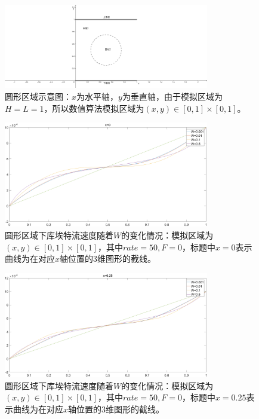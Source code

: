 \documentclass[11pt,UTF8]{ctexart}
\begin{document}
    \begin{figure}[h]
        \centerline{\includegraphics[width=0.8\textwidth]{circle.png}}
        \caption{圆形区域示意图：$x$为水平轴，$y$为垂直轴，由于模拟区域为$H=L=1$，所以数值算法模拟区域为$(x,y)\in [0,1]\times [0,1]$。}
        \label{img8}
    \end{figure}
    \begin{figure}[h]
        \centerline{\includegraphics[width=0.8\textwidth]{Circul_P_W/x=0.png}}
        \caption{圆形区域下库埃特流速度随着$W$的变化情况：模拟区域为$(x,y)\in [0,1]\times [0,1]$，其中$rate=50,F=0$，标题中$x=0$表示曲线为在对应$x$轴位置的3维图形的截线。}
        \label{img11}
    \end{figure}
    \begin{figure}[h]
        \centerline{\includegraphics[width=0.8\textwidth]{Circul_P_W/x=0_25.png}}
        \caption{圆形区域下库埃特流速度随着$W$的变化情况：模拟区域为$(x,y)\in [0,1]\times [0,1]$，其中$rate=50,F=0$，标题中$x=0.25$表示曲线为在对应$x$轴位置的3维图形的截线。}
        \label{img12}
    \end{figure}
\end{document}
